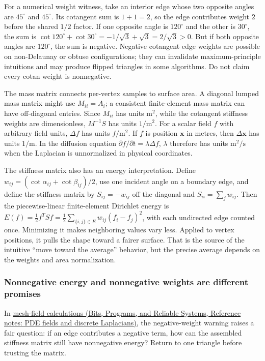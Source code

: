 For a numerical weight witness, take an interior edge whose two opposite angles are \(45^\circ\) and \(45^\circ\). Its cotangent sum is \(1+1=2\), so the edge contributes weight \(2\) before the shared \(1/2\) factor. If one opposite angle is \(120^\circ\) and the other is \(30^\circ\), the sum is \(\cot120^\circ+\cot30^\circ=-1/\sqrt3+\sqrt3=2/\sqrt3>0\). But if both opposite angles are \(120^\circ\), the sum is negative. Negative cotangent edge weights are possible on non-Delaunay or obtuse configurations; they can invalidate maximum-principle intuitions and may produce flipped triangles in some algorithms. Do not claim every cotan weight is nonnegative.

The mass matrix connects per-vertex samples to surface area. A diagonal lumped mass matrix might use \(M_{ii}=A_i\); a consistent finite-element mass matrix can have off-diagonal entries. Since \(M_{ii}\) has units \(\mathrm m^2\), while the cotangent stiffness weights are dimensionless, \(M^{-1}S\) has units \(1/\mathrm m^2\). For a scalar field \(f\) with arbitrary field units, \(\Delta f\) has units \(f/\mathrm m^2\). If \(f\) is position \(\mathbf x\) in metres, then \(\Delta\mathbf x\) has units \(1/\mathrm m\). In the diffusion equation \(\partial f/\partial t=\lambda\Delta f\), \(\lambda\) therefore has units \(\mathrm m^2/\mathrm s\) when the Laplacian is unnormalized in physical coordinates.

The stiffness matrix also has an energy interpretation. Define \(w_{ij}=(\cot\alpha_{ij}+\cot\beta_{ij})/2\), use one incident angle on a boundary edge, and define the stiffness matrix by \(S_{ij}=-w_{ij}\) off the diagonal and \(S_{ii}=\sum_j w_{ij}\). Then the piecewise-linear finite-element Dirichlet energy is \(E(f)=\frac12 f^T S f=\frac12\sum_{\{i,j\}\in E}w_{ij}(f_i-f_j)^2\), with each undirected edge counted once. Minimizing it makes neighboring values vary less. Applied to vertex positions, it pulls the shape toward a fairer surface. That is the source of the intuitive ``move toward the average'' behavior, but the precise average depends on the weights and area normalization.

\subsubsection{Nonnegative energy and nonnegative weights are different promises}\label{03-visual-computing-i-ch002-nonnegative-energy-and-nonnegative-weights-are-different-promises}

In \href{../01-Bits-Programs-and-Reliable-Systems/main.pdf\#nameddest=appendix-1988d465c119}{mesh-field calculations (Bits, Programs, and Reliable Systems, Reference notes: PDE fields and discrete Laplacians)}, the negative-weight warning raises a fair question: if an edge contributes a negative term, how can the assembled stiffness matrix still have nonnegative energy? Return to one triangle before trusting the matrix.

